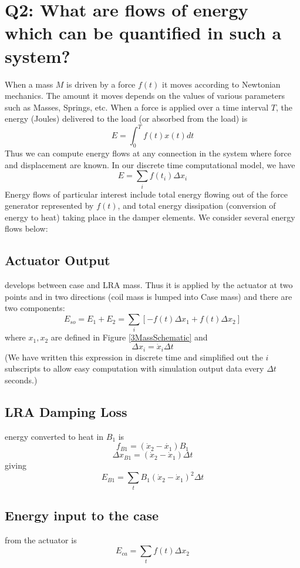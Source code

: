 \documentclass[letterpaper,11pt]{article}
\begin{document}
\section{Q2: What are flows of energy which can be quantified in such a system?}
\label{WhatAreEnergyFlows}

When a mass $M$ is driven by a force $f(t)$ it moves according to Newtonian mechanics.  The amount it moves depends on the values of various
parameters such as Masses, Springs, etc.
When a force is applied over a time interval $T$, the energy (Joules)
delivered to the load (or absorbed from the load) is
\[
E = \int_0^T f(t)x(t)dt
\]
Thus we can compute energy flows at any connection in the system where
force and displacement are known.  In our discrete time computational model,
we have
\[
E = \sum_i f(t_i)\Delta x_i
\]
Energy flows of particular interest include total energy flowing out of the force generator represented by $f(t)$, and
total energy dissipation (conversion of energy to heat) taking place in the damper elements.
We consider several energy flows below:

\subsection{Actuator Output}   develops between case and LRA mass. Thus
    it is applied by the actuator at two points and in two directions
    (coil mass is lumped into Case mass) and there are two components:
    \[
    E_{so} = E_1 + E_2 = \sum_i \left[ -f(t) \Delta x_1 + f(t)\Delta x_2 \right]
    \]
    where $x_1, x_2$ are defined in Figure \ref{3MassSchematic} and
    \[
    \Delta x_i = \dot{x}_i\Delta t
    \]
    (We have written this expression in discrete time and simplified out the $i$
    subscripts to allow easy computation with
    simulation output data every $\Delta t$ seconds.)


\subsection{LRA Damping Loss}
    energy converted to heat in $B_1$ is
    \[
    f_{B1} = (\dot{x}_2-\dot{x_1})B_1
    \]
    \[
    \Delta x_{B1} = (\dot{x}_2-\dot{x}_1)\Delta t
    \]
    giving
    \[
    E_{B1} = \sum_t B_1(\dot{x}_2-\dot{x}_1)^2\Delta t
    \]

\subsection{Energy input to the case}  from the actuator is
    \[
    E_{ca} = \sum_t  f(t)\Delta x_2
    \]
\end{document}
